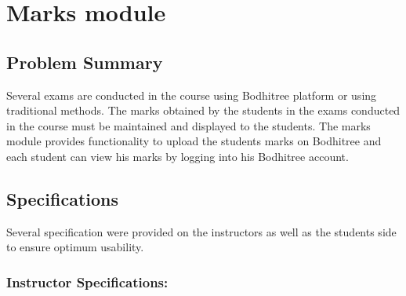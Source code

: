 \section{Marks module}

\subsection{Problem Summary}

\hspace{0.35cm} Several exams are conducted in the course using Bodhitree platform or using traditional methods. The marks obtained by the students in the exams conducted in the course must be maintained and displayed to the students. The marks module provides functionality to upload the students marks on Bodhitree and each student can view his marks by logging into his Bodhitree account.

\subsection{Specifications}

\hspace{0.35cm} Several specification were provided on the instructors as well as the students side to ensure optimum usability.

\subsubsection*{Instructor Specifications:}

